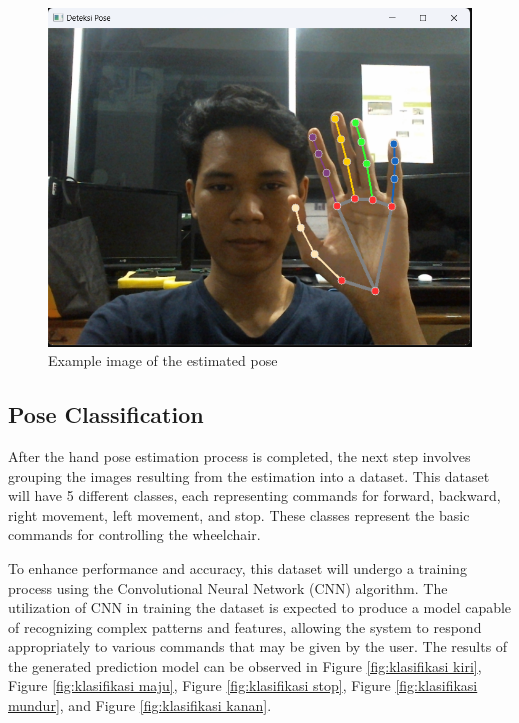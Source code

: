 \begin{figure} [ht] \centering
  \includegraphics[scale=0.5]{gambar/bab3/EstimasiPose.png}
  \caption{Example image of the estimated pose}
  \label{fig:contoh citra yang telah diestimasi pose}
\end{figure}

\newpage

\subsection{Pose Classification}
After the hand pose estimation process is completed, the next step involves grouping the images resulting from the estimation into a dataset. This dataset will have 5 different classes, each representing commands for forward, backward, right movement, left movement, and stop. These classes represent the basic commands for controlling the wheelchair. 

To enhance performance and accuracy, this dataset will undergo a training process using the Convolutional Neural Network (CNN) algorithm. The utilization of CNN in training the dataset is expected to produce a model capable of recognizing complex patterns and features, allowing the system to respond appropriately to various commands that may be given by the user. The results of the generated prediction model can be observed in Figure \ref{fig:klasifikasi kiri}, Figure \ref{fig:klasifikasi maju}, Figure \ref{fig:klasifikasi stop}, Figure \ref{fig:klasifikasi mundur}, and Figure \ref{fig:klasifikasi kanan}.

